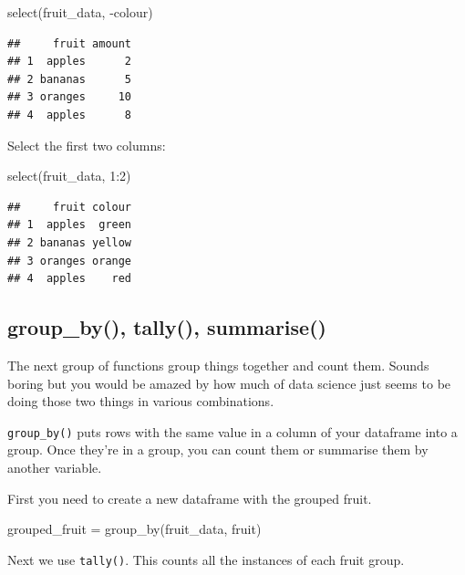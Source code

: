 \documentclass[
]{book}
\newenvironment{Shaded}{\begin{snugshade}}{\end{snugshade}}
\newcommand{\DecValTok}[1]{\textcolor[rgb]{0.00,0.00,0.81}{#1}}
\newcommand{\FunctionTok}[1]{\textcolor[rgb]{0.00,0.00,0.00}{#1}}
\newcommand{\NormalTok}[1]{#1}
\newcommand{\OtherTok}[1]{\textcolor[rgb]{0.56,0.35,0.01}{#1}}
\newcommand{\SpecialCharTok}[1]{\textcolor[rgb]{0.00,0.00,0.00}{#1}}
\begin{document}
\begin{Shaded}
\begin{Highlighting}[]
\FunctionTok{select}\NormalTok{(fruit\_data, }\SpecialCharTok{{-}}\NormalTok{colour)}
\end{Highlighting}
\end{Shaded}

\begin{verbatim}
##     fruit amount
## 1  apples      2
## 2 bananas      5
## 3 oranges     10
## 4  apples      8
\end{verbatim}

Select the first two columns:

\begin{Shaded}
\begin{Highlighting}[]
\FunctionTok{select}\NormalTok{(fruit\_data, }\DecValTok{1}\SpecialCharTok{:}\DecValTok{2}\NormalTok{)}
\end{Highlighting}
\end{Shaded}

\begin{verbatim}
##     fruit colour
## 1  apples  green
## 2 bananas yellow
## 3 oranges orange
## 4  apples    red
\end{verbatim}

\hypertarget{group_by-tally-summarise}{%
\subsection{group\_by(), tally(), summarise()}\label{group_by-tally-summarise}}

The next group of functions group things together and count them. Sounds boring but you would be amazed by how much of data science just seems to be doing those two things in various combinations.

\texttt{group\_by()} puts rows with the same value in a column of your dataframe into a group. Once they're in a group, you can count them or summarise them by another variable.

First you need to create a new dataframe with the grouped fruit.

\begin{Shaded}
\begin{Highlighting}[]
\NormalTok{grouped\_fruit }\OtherTok{=} \FunctionTok{group\_by}\NormalTok{(fruit\_data, fruit)}
\end{Highlighting}
\end{Shaded}

Next we use \texttt{tally()}. This counts all the instances of each fruit group.
\end{document}
